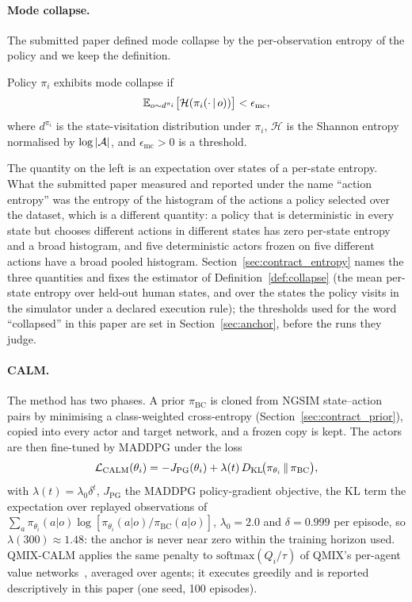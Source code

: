 \paragraph{Mode collapse.}
The submitted paper defined mode collapse by the per-observation entropy of the policy and we keep the definition.
\begin{definition}
\label{def:collapse}
Policy $\pi_i$ exhibits mode collapse if
\begin{equation}
\mathbb{E}_{o\sim d^{\pi_i}}\big[\mathcal{H}(\pi_i(\cdot\,|\,o))\big]<\epsilon_{\mathrm{mc}},
\end{equation}
where $d^{\pi_i}$ is the state-visitation distribution under $\pi_i$, $\mathcal{H}$ is the Shannon entropy normalised by $\log|\mathcal{A}|$, and $\epsilon_{\mathrm{mc}}>0$ is a threshold.
\end{definition}
The quantity on the left is an expectation over states of a per-state entropy. What the submitted paper measured and reported under the name ``action entropy'' was the entropy of the histogram of the actions a policy selected over the dataset, which is a different quantity: a policy that is deterministic in every state but chooses different actions in different states has zero per-state entropy and a broad histogram, and five deterministic actors frozen on five different actions have a broad pooled histogram. Section~\ref{sec:contract_entropy} names the three quantities and fixes the estimator of Definition~\ref{def:collapse} (the mean per-state entropy over held-out human states, and over the states the policy visits in the simulator under a declared execution rule); the thresholds used for the word ``collapsed'' in this paper are set in Section~\ref{sec:anchor}, before the runs they judge.

\paragraph{CALM.}
The method has two phases. A prior $\pi_{\mathrm{BC}}$ is cloned from NGSIM state--action pairs by minimising a class-weighted cross-entropy (Section~\ref{sec:contract_prior}), copied into every actor and target network, and a frozen copy is kept. The actors are then fine-tuned by MADDPG under the loss
\begin{equation}
\mathcal{L}_{\mathrm{CALM}}(\theta_i)=-J_{\mathrm{PG}}(\theta_i)+\lambda(t)\,D_{\mathrm{KL}}\!\big(\pi_{\theta_i}\,\|\,\pi_{\mathrm{BC}}\big),
\label{eq:calm}
\end{equation}
with $\lambda(t)=\lambda_0\delta^{t}$, $J_{\mathrm{PG}}$ the MADDPG policy-gradient objective, the KL term the expectation over replayed observations of $\sum_a\pi_{\theta_i}(a|o)\log[\pi_{\theta_i}(a|o)/\pi_{\mathrm{BC}}(a|o)]$, $\lambda_0=2.0$ and $\delta=0.999$ per episode, so $\lambda(300)\approx1.48$: the anchor is never near zero within the training horizon used. QMIX-CALM applies the same penalty to $\mathrm{softmax}(Q_i/\tau)$ of QMIX's per-agent value networks~\cite{rashid2018qmix}, averaged over agents; it executes greedily and is reported descriptively in this paper (one seed, 100 episodes).

